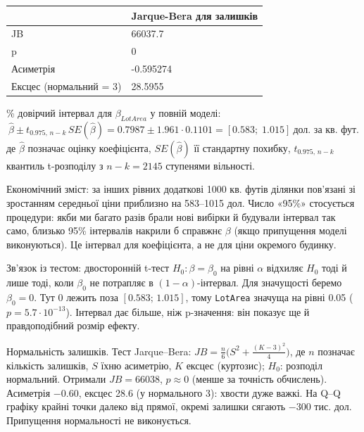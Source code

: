 \begingroup\fontsize{7.5}{9.5}\selectfont\setlength{\tabcolsep}{2.5mm}\renewcommand{\arraystretch}{1.15}
\par\vspace{2pt}\noindent\begin{tabular}{|ll|}
\hline
 & Jarque-Bera для залишків \\
\hline
JB & 66037.7 \\
p & 0 \\
Асиметрія & -0.595274 \\
Ексцес (нормальний = 3) & 28.5955 \\
\hline
\end{tabular}\par\vspace{2pt}
\endgroup


\clearpage

\% довірчий інтервал для \(\beta_{LotArea}\) у повній моделі:
\[\widehat\beta\pm t_{0.975,\,n-k}\,SE(\widehat\beta)=0.7987\pm1.961\cdot0.1101=[0.583;\;1.015]\ \text{дол. за кв. фут}.\]
де \(\widehat\beta\) позначає оцінку коефіцієнта, \(SE(\widehat\beta)\)
її стандартну похибку, \(t_{0.975,\,n-k}\) квантиль t-розподілу з
\(n-k=2145\) ступенями вільності.

Економічний зміст: за інших рівних додаткові 1000 кв. футів ділянки
пов'язані зі зростанням середньої ціни приблизно на 583--1015 дол. Число
«95\%» стосується процедури: якби ми багато разів брали нові вибірки й
будували інтервал так само, близько 95\% інтервалів накрили б справжнє
\(\beta\) (якщо припущення моделі виконуються). Це інтервал для
коефіцієнта, а не для ціни окремого будинку.

Зв'язок із тестом: двосторонній t-тест \(H_0:\beta=\beta_0\) на рівні
\(\alpha\) відхиляє \(H_0\) тоді й лише тоді, коли \(\beta_0\) не
потрапляє в \((1-\alpha)\)-інтервал. Для значущості беремо
\(\beta_0=0\). Тут 0 лежить поза \([0.583;\,1.015]\), тому
\texttt{LotArea} значуща на рівні 0.05 (\(p=5.7\cdot10^{-13}\)).
Інтервал дає більше, ніж p-значення: він показує ще й правдоподібний
розмір ефекту.

Нормальність залишків. Тест Jarque--Bera:
\(JB=\frac n6\big(S^2+\frac{(K-3)^2}4\big)\), де \(n\) позначає
кількість залишків, \(S\) їхню асиметрію, \(K\) ексцес (куртозис);
\(H_0\): розподіл нормальний. Отримали \(JB=66038\), \(p\approx0\)
(менше за точність обчислень). Асиметрія \(-0.60\), ексцес 28.6 (у
нормального 3): хвости дуже важкі. На Q--Q графіку крайні точки далеко
від прямої, окремі залишки сягають \(-300\) тис. дол. Припущення
нормальності не виконується.

